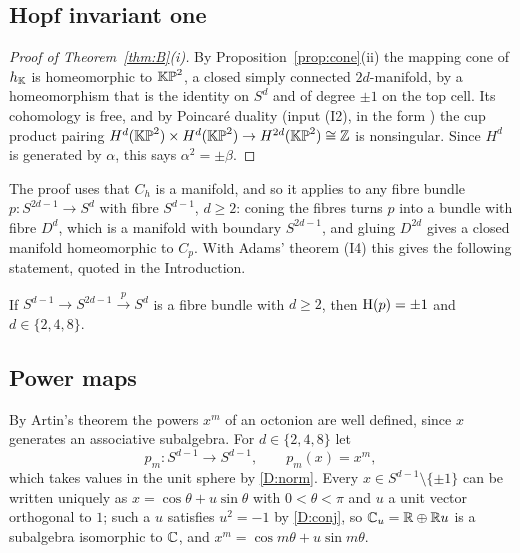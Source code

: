 \subsection{Hopf invariant one}\label{sec:hone}

\begin{proof}[Proof of Theorem~\ref{thm:B}\textup{(i)}]
By Proposition~\ref{prop:cone}(ii) the mapping cone of $h_{\mathbb{K}}$ is homeomorphic to $\mathbb{KP}^2$, a closed simply connected $2d$-manifold, by a homeomorphism that is the identity on $S^d$ and of degree $\pm1$ on the top cell. Its cohomology is free, and by Poincar\'e duality (input (I2), in the form \cite[Proposition~3.38]{Hat02}) the cup product pairing $H^d(\mathbb{KP}^2)\times H^d(\mathbb{KP}^2)\to H^{2d}(\mathbb{KP}^2)\cong\mathbb{Z}$ is nonsingular. Since $H^d$ is generated by $\alpha$, this says $\alpha^2=\pm\beta$.
\end{proof}

\begin{remark}
The proof uses that $C_{h}$ is a manifold, and so it applies to any fibre bundle $p\colon S^{2d-1}\to S^d$ with fibre $S^{d-1}$, $d\ge2$: coning the fibres turns $p$ into a bundle with fibre $D^d$, which is a manifold with boundary $S^{2d-1}$, and gluing $D^{2d}$ gives a closed manifold homeomorphic to $C_p$. With Adams' theorem (I4) this gives the following statement, quoted in the Introduction.
\end{remark}

\begin{corollary}\label{cor:spherebundles}
If $S^{d-1}\to S^{2d-1}\xrightarrow{\,p\,}S^d$ is a fibre bundle with $d\ge2$, then $\mathrm{H}(p)=\pm1$ and $d\in\{2,4,8\}$.
\end{corollary}

\subsection{Power maps}\label{sec:powers}

By Artin's theorem the powers $x^m$ of an octonion are well defined, since $x$ generates an associative subalgebra. For $d\in\{2,4,8\}$ let
\[
p_m\colon S^{d-1}\to S^{d-1},\qquad p_m(x)=x^m ,
\]
which takes values in the unit sphere by \ref{D:norm}. Every $x\in S^{d-1}\setminus\{\pm1\}$ can be written uniquely as $x=\cos\theta+u\sin\theta$ with $0<\theta<\pi$ and $u$ a unit vector orthogonal to $1$; such a $u$ satisfies $u^2=-1$ by \ref{D:conj}, so $\mathbb{C}_u=\mathbb{R}\oplus\mathbb{R} u$ is a subalgebra isomorphic to $\mathbb{C}$, and $x^m=\cos m\theta+u\sin m\theta$.

